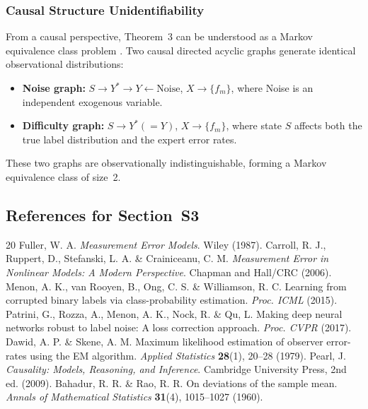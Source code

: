 \subsubsection{Causal Structure Unidentifiability}

From a causal perspective, Theorem~3 can be understood as a Markov equivalence
class problem \cite{pearl2009causality}.  Two causal directed acyclic graphs
generate identical observational distributions:
\begin{itemize}
  \item \textbf{Noise graph:} $S\to Y^*\to Y\leftarrow\text{Noise}$,
    $X\to\{f_m\}$, where Noise is an independent exogenous variable.
  \item \textbf{Difficulty graph:} $S\to Y^*(=Y)$, $X\to\{f_m\}$, where state
    $S$ affects both the true label distribution and the expert error rates.
\end{itemize}
These two graphs are observationally indistinguishable, forming a
Markov equivalence class of size~2.

\subsection*{References for Section~S3}

\begingroup
\small
\begin{thebibliography}{20}
 Fuller, W. A. \textit{Measurement Error Models}. Wiley (1987).
 Carroll, R. J., Ruppert, D., Stefanski, L. A. \& Crainiceanu, C. M. \textit{Measurement Error in Nonlinear Models: A Modern Perspective}. Chapman and Hall/CRC (2006).
 Menon, A. K., van Rooyen, B., Ong, C. S. \& Williamson, R. C. Learning from corrupted binary labels via class-probability estimation. \textit{Proc. ICML} (2015).
 Patrini, G., Rozza, A., Menon, A. K., Nock, R. \& Qu, L. Making deep neural networks robust to label noise: A loss correction approach. \textit{Proc. CVPR} (2017).
 Dawid, A. P. \& Skene, A. M. Maximum likelihood estimation of observer error-rates using the EM algorithm. \textit{Applied Statistics} \textbf{28}(1), 20--28 (1979).
 Pearl, J. \textit{Causality: Models, Reasoning, and Inference}. Cambridge University Press, 2nd ed. (2009).
 Bahadur, R. R. \& Rao, R. R. On deviations of the sample mean. \textit{Annals of Mathematical Statistics} \textbf{31}(4), 1015--1027 (1960).
\end{thebibliography}
\endgroup

